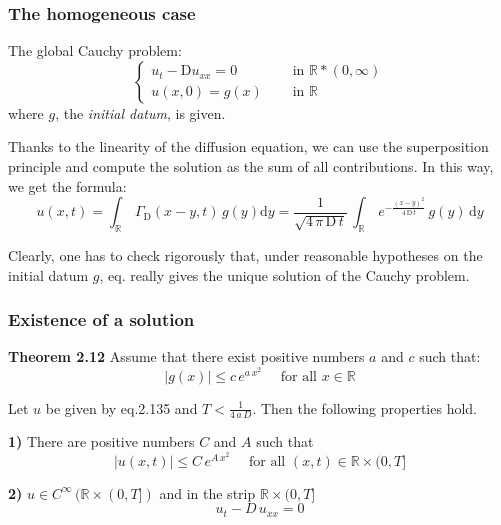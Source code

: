 \documentclass[../main.tex]{subfiles}
\begin{document}
\subsubsection{The homogeneous case}

The global Cauchy problem:
\begin{equation}
    \begin{cases}
    u_t - \mathrm{D} u_{xx} = 0 \quad & \text{ in } \mathbb{R} * (0, \infty) \\
    u(x, 0) = g(x) \quad & \text{ in } \mathbb{R}
    \end{cases}
\end{equation}
where $g$, the \textit{initial datum}, is given.

Thanks to the linearity of the diffusion equation, we can use the superposition principle and compute the solution as the sum of all contributions. In this way, we get the formula:
\begin{equation}
    u(x,t) = \int_{\mathbb{R}} \, \Gamma_\mathrm{D}(x-y,t) \, g(y) \mathrm{d} y = \frac{1}{\sqrt{4 \, \pi \, \mathrm{D} \, t}} \, \int_{\mathbb{R}} \, e^{- \frac{(x-y)^2}{4 \,  \mathrm{D} \, t}} \, g(y) \, \mathrm{d} y 
\end{equation}

Clearly, one has to check rigorously that, under reasonable hypotheses on the initial datum $g$, eq.  really gives the unique solution of the Cauchy problem.

\subsubsection{Existence of a solution}

\textbf{Theorem 2.12}  Assume that there exist positive numbers $a$ and $c$ such that:
\begin{equation}
    |g(x)| \leqslant c \, e^{a \, x^2} \quad \text{ for all  } x \in \mathbb{R}
\end{equation}

Let $u$ be given by eq.2.135 and $T < \frac{1}{4 \, a \, D}$. Then the following properties hold.

\textbf{1)}  There are positive numbers $C$ and $A$ such that
\begin{equation}
    |u(x,t)| \leqslant C \, e^{A \, x^2} \quad \text{ for all  } (x,t) \in \mathbb{R} \times (0,T]
\end{equation}

\textbf{2)}  $u \in C ^{\infty} \, (\mathbb{R} \times (0,T])$ and in the strip $\mathbb{R} \times (0,T]$
\begin{equation}
    u_t - D \, u_{xx} = 0
\end{equation}
\end{document}
